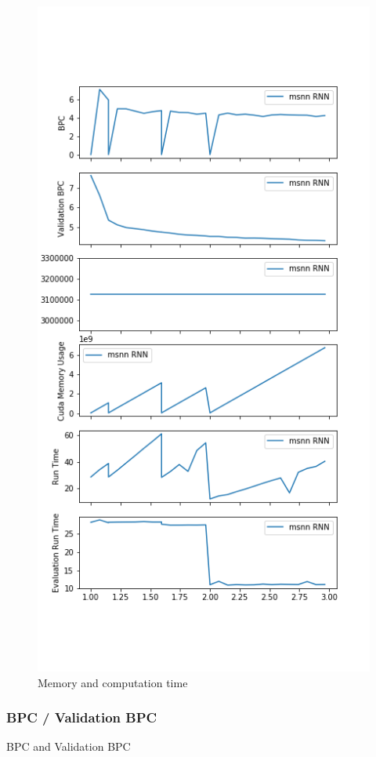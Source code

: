 \begin{figure}[H]
\centering
\includegraphics[height=.8\textheight]{parts/appendix/reports-gmsnn/docs_esteban-latex/test_reports/2018-06-11/frac.png}
\caption{Memory and computation time}
\end{figure}

\newpage
\subsubsection{BPC / Validation BPC}

BPC and Validation BPC

